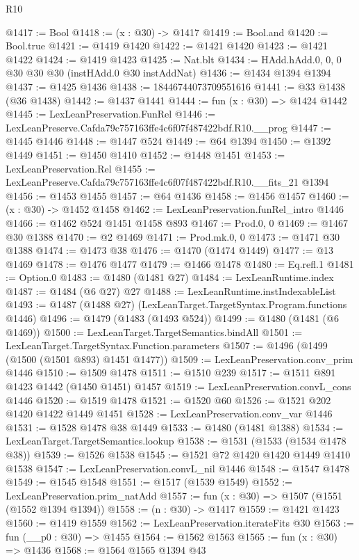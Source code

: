 \begin{lexlean}{R10}
\begin{coremodule}
@1417 := Bool
@1418 := (x : @30) -> @1417
@1419 := Bool.and
@1420 := Bool.true
@1421 := @1419 @1420
@1422 := @1421 @1420
@1423 := @1421 @1422
@1424 := @1419 @1423
@1425 := Nat.blt
@1434 := HAdd.hAdd.{0, 0, 0} @30 @30 @30 (instHAdd.{0} @30 instAddNat)
@1436 := @1434 @1394 @1394
@1437 := @1425 @1436
@1438 := 18446744073709551616
@1441 := @33 @1438 (@36 @1438)
@1442 := @1437 @1441
@1444 := fun (x : @30) => @1424 @1442
@1445 := LexLeanPreservation.FunRel
@1446 := LexLeanPreserve.Cafda79c757163ffe4c6f07f487422bdf.R10.__prog
@1447 := @1445 @1446
@1448 := @1447 @524
@1449 := @64 @1394
@1450 := @1392 @1449
@1451 := @1450 @1410
@1452 := @1448 @1451
@1453 := LexLeanPreservation.Rel
@1455 := LexLeanPreserve.Cafda79c757163ffe4c6f07f487422bdf.R10.__fits_21 @1394
@1456 := @1453 @1455
@1457 := @64 @1436
@1458 := @1456 @1457
@1460 := (x : @30) -> @1452 @1458
@1462 := LexLeanPreservation.funRel_intro @1446
@1466 := @1462 @524 @1451 @1458 @893
@1467 := Prod.{0, 0}
@1469 := @1467 @30 @1388
@1470 := @2 @1469
@1471 := Prod.mk.{0, 0}
@1473 := @1471 @30 @1388
@1474 := @1473 @38
@1476 := @1470 (@1474 @1449)
@1477 := @13 @1469
@1478 := @1476 @1477
@1479 := @1466 @1478
@1480 := Eq.refl.{1}
@1481 := Option.{0}
@1483 := @1480 (@1481 @27)
@1484 := LexLeanRuntime.index
@1487 := @1484 (@6 @27) @27
@1488 := LexLeanRuntime.instIndexableList
@1493 := @1487 (@1488 @27) (LexLeanTarget.TargetSyntax.Program.functions @1446)
@1496 := @1479 (@1483 (@1493 @524))
@1499 := @1480 (@1481 (@6 @1469))
@1500 := LexLeanTarget.TargetSemantics.bindAll
@1501 := LexLeanTarget.TargetSyntax.Function.parameters
@1507 := @1496 (@1499 (@1500 (@1501 @893) @1451 @1477))
@1509 := LexLeanPreservation.conv_prim @1446
@1510 := @1509 @1478
@1511 := @1510 @239
@1517 := @1511 @891 @1423 @1442 (@1450 @1451) @1457
@1519 := LexLeanPreservation.convL_cons @1446
@1520 := @1519 @1478
@1521 := @1520 @60
@1526 := @1521 @202 @1420 @1422 @1449 @1451
@1528 := LexLeanPreservation.conv_var @1446
@1531 := @1528 @1478 @38 @1449
@1533 := @1480 (@1481 @1388)
@1534 := LexLeanTarget.TargetSemantics.lookup
@1538 := @1531 (@1533 (@1534 @1478 @38))
@1539 := @1526 @1538
@1545 := @1521 @72 @1420 @1420 @1449 @1410 @1538
@1547 := LexLeanPreservation.convL_nil @1446
@1548 := @1547 @1478
@1549 := @1545 @1548
@1551 := @1517 (@1539 @1549)
@1552 := LexLeanPreservation.prim_natAdd
@1557 := fun (x : @30) => @1507 (@1551 (@1552 @1394 @1394))
@1558 := (n : @30) -> @1417
@1559 := @1421 @1423
@1560 := @1419 @1559
@1562 := LexLeanPreservation.iterateFits @30
@1563 := fun (__p0 : @30) => @1455
@1564 := @1562 @1563
@1565 := fun (x : @30) => @1436
@1568 := @1564 @1565 @1394 @43

\end{coremodule}
\end{lexlean}
